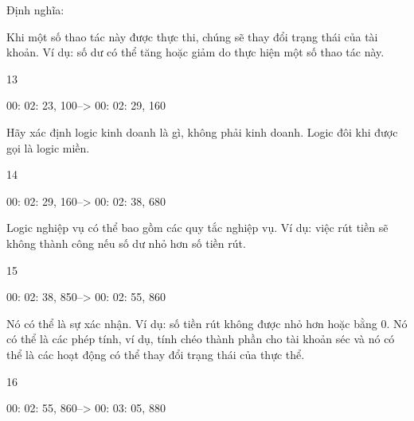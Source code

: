 Định nghĩa:
\begin{example}
    
\end{example}





 

 


Khi một số thao tác này được thực thi, chúng sẽ thay đổi trạng thái của tài khoản. Ví dụ: số dư có thể tăng hoặc giảm do thực hiện một số thao tác này.

13

00: 02: 23, 100--> 00: 02: 29, 160

Hãy xác định logic kinh doanh là gì, không phải kinh doanh. Logic đôi khi được gọi là logic miền.

14

00: 02: 29, 160--> 00: 02: 38, 680

Logic nghiệp vụ có thể bao gồm các quy tắc nghiệp vụ. Ví dụ: việc rút tiền sẽ không thành công nếu số dư nhỏ hơn số tiền rút.

15

00: 02: 38, 850--> 00: 02: 55, 860

Nó có thể là sự xác nhận. Ví dụ: số tiền rút không được nhỏ hơn hoặc bằng 0. Nó có thể là các phép tính, ví dụ, tính chéo thành phần cho tài khoản séc và nó có thể là các hoạt động có thể thay đổi trạng thái của thực thể.

16

00: 02: 55, 860--> 00: 03: 05, 880

